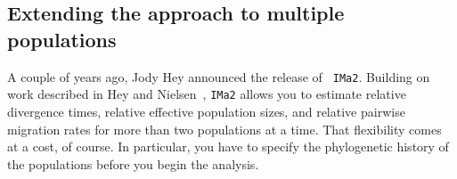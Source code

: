 \subsection*{Extending the approach to multiple populations}

A couple of years ago, Jody Hey announced the release of {\tt
  IMa2}. Building on work described in Hey and
Nielsen~\cite{Hey-Nielsen-2004,Hey-Nielsen-2007}, {\tt IMa2} allows
you to estimate relative divergence times, relative effective
population sizes, and relative pairwise migration rates for more than
two populations at a time. That flexibility comes at a cost, of
course. In particular, you have to specify the phylogenetic history of
the populations before you begin the analysis.

